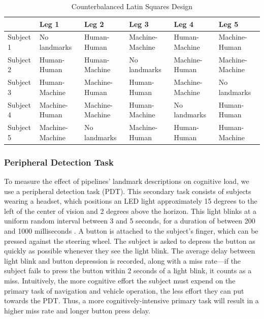 \begin{table}[htbp]
  \centering
  \caption{Counterbalanced Latin Squares Design}
  \label{tab:latinsquares}
  {\tabulinesep=2mm
    \begin{singlespace}
    \begin{tabu} to \textwidth{|X[c]||X[c]|X[c]|X[c]|X[c]|X[c]|}
        \hline
        & Leg 1 & Leg 2 & Leg 3 & Leg 4 & Leg 5 \\
        \hline\hline
        Subject 1 & No landmarks    & Human-Human     & Machine-Machine & Human-Machine   & Machine-Human   \\
                \hline
        Subject 2 & Human-Human     & Human-Machine   & No landmarks    & Machine-Human   & Machine-Machine \\
                \hline
        Subject 3 & Human-Machine   & Machine-Human   & Human-Human     & Machine-Machine & No landmarks    \\
                \hline
        Subject 4 & Machine-Human   & Machine-Machine & Human-Machine   & No landmarks    & Human-Human     \\
                \hline
        Subject 5 & Machine-Machine & No landmarks    & Machine-Human   & Human-Human     & Human-Machine   \\
    \hline
    \end{tabu}
    \end{singlespace}
    }
\end{table}

\subsubsection{Peripheral Detection Task}

To measure the effect of pipelines' landmark descriptions on cognitive load, we use a peripheral detection task (PDT). This secondary task consists of subjects wearing a headset, which positions an LED light approximately 15 degrees to the left of the center of vision and 2 degrees above the horizon. This light blinks at a uniform random interval between 3 and 5 seconds, for a duration of between 200 and 1000 milliseconds \cite{martens2000measuring}. A button is attached to the subject's finger, which can be pressed against the steering wheel. The subject is asked to depress the button as quickly as possible whenever they see the light blink. The average delay between light blink and button depression is recorded, along with a miss rate---if the subject fails to press the button within 2 seconds of a light blink, it counts as a miss. Intuitively, the more cognitive effort the subject must expend on the primary task of navigation and vehicle operation, the less effort they can put towards the PDT. Thus, a more cognitively-intensive primary task will result in a higher miss rate and longer button press delay.

